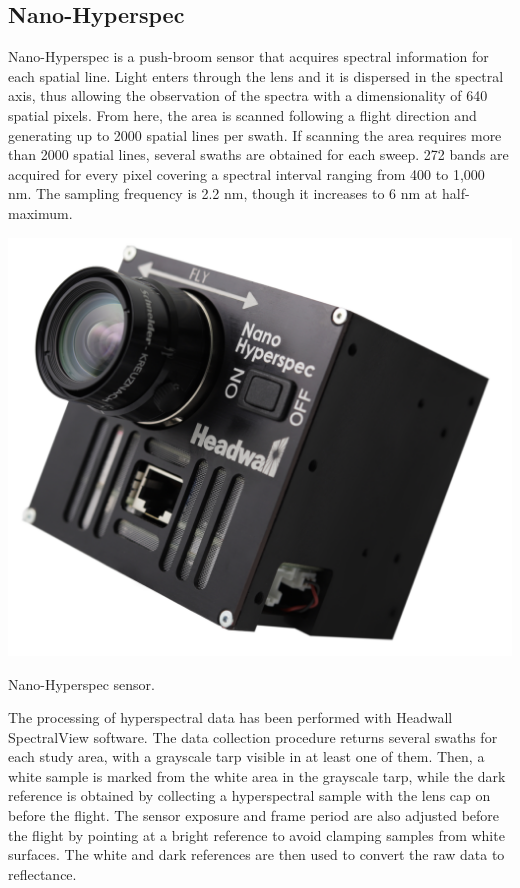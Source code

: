 \subsection{Nano-Hyperspec}

Nano-Hyperspec is a push-broom sensor that acquires spectral information for each spatial line. Light enters through the lens and it is dispersed in the spectral axis, thus allowing the observation of the spectra with a dimensionality of 640 spatial pixels. From here, the area is scanned following a flight direction and generating up to 2000 spatial lines per swath. If scanning the area requires more than 2000 spatial lines, several swaths are obtained for each sweep. 272 bands are acquired for every pixel covering a spectral interval ranging from 400 to 1,000 \si{\nano\meter}. The sampling frequency is 2.2 \si{\nano\meter}, though it increases to 6 \si{\nano\meter} at half-maximum.

\begin{marginfigure}[-3.0cm]
	\includegraphics{figs/materials/nano_hyperspec.png}
	\caption{Nano-Hyperspec sensor.}
	\label{fig:nano_hyperspec}
\end{marginfigure}

The processing of hyperspectral data has been performed with Headwall SpectralView\texttrademark \hspace{1mm} software. The data collection procedure returns several swaths for each study area, with a grayscale tarp visible in at least one of them. Then, a white sample is marked from the white area in the grayscale tarp, while the dark reference is obtained by collecting a hyperspectral sample with the lens cap on before the flight. The sensor exposure and frame period are also adjusted before the flight by pointing at a bright reference to avoid clamping samples from white surfaces. The white and dark references are then used to convert the raw data to reflectance. 

